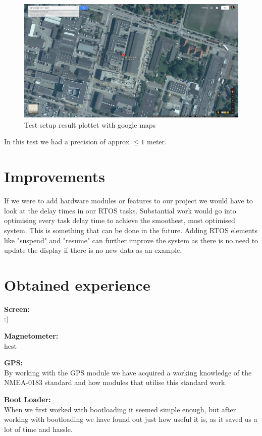 \begin{figure}[H]
\centering
\includegraphics[width=.9\textwidth]{billeder/coordinate_map}
\caption{Test setup result plottet with google maps}
\end{figure}

In this test we had a precision of approx $\leq1$ meter.

\chapter{Improvements}
If we were to add hardware modules or features to our project we would have to look at the delay times in our RTOS tasks. Substantial work would go into optimising every task delay time to achieve the smoothest, most optimised system. This is something that can be done in the future. Adding RTOS elements like "suspend" and "resume" can further improve the system as there is no need to update the display if there is no new data as an example. \\

\chapter{Obtained experience}
\textbf{Screen:}\\
:)

\textbf{Magnetometer:}\\
hest

\textbf{GPS:}\\
By working with the GPS module we have acquired a working knowledge of the NMEA-0183 standard and how modules that utilise this standard work. 

\textbf{Boot Loader:}\\
When we first worked with bootloading it seemed simple enough, but after working with bootloading we have found out just how useful it is, as it saved us a lot of time and hassle.

